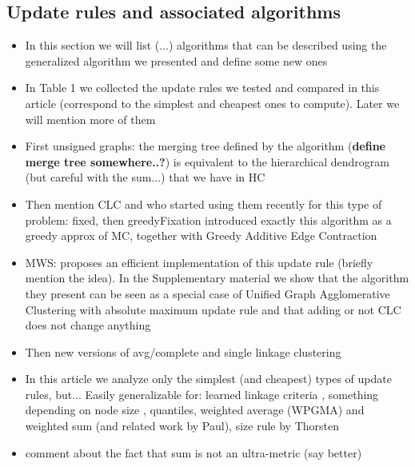 \subsection{Update rules and associated algorithms}
\begin{itemize}
\item In this section we will list  (...) algorithms that can be described using the generalized algorithm we presented and define some new ones
\item In Table 1 we collected the update rules we tested and compared in this article (correspond to the simplest and cheapest ones to compute). Later we will mention more of them
\item First unsigned graphs: the merging tree defined by the algorithm (\textbf{define merge tree somewhere..?}) is equivalent to the hierarchical dendrogram (but careful with the sum...) that we have in HC
\item Then mention CLC and who started using them recently for this type of problem: fixed, then greedyFixation introduced exactly this algorithm as a greedy approx of MC, together with Greedy Additive Edge Contraction
\item MWS: proposes an efficient implementation of this update rule (briefly mention the idea). In the Supplementary material we show that the algorithm they present can be seen as a special case of Unified Graph Agglomerative Clustering with absolute maximum update rule and that adding or not CLC does not change anything
\item Then new versions of avg/complete and single linkage clustering 
\item In this article we analyze only the simplest (and cheapest) types of update rules, but... Easily generalizable for: learned linkage criteria \cite{nunez2013machine}, something depending on node size \cite{felzenszwalb2004efficient}, quantiles, weighted average (WPGMA) and weighted sum (and related work by Paul), size rule by Thorsten
\item comment about the fact that sum is not an ultra-metric (say better)
\end{itemize}



